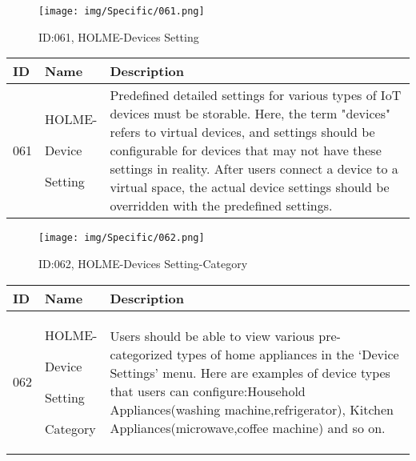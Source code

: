 \documentclass[conference]{IEEEtran}
\begin{document}
\begin{enumerate}
\begin{figure}[h]
\centering
\texttt{[image: img/Specific/061.png]}
\caption{ID:061, HOLME-Devices Setting}
\end{figure}
\begin{table}[h]
\def\arraystretch{1.2} \small
    \begin{tabular}{|p{1cm}|p{1.8cm}|p{5.0cm}|}
        \hline
        ID & Name & Description\\ \hline
         061 \par  & HOLME-\par Device \par Setting  & Predefined detailed settings for various types of IoT devices must be storable. Here, the term "devices" refers to virtual devices, and settings should be configurable for devices that may not have these settings in reality. After users connect a device to a virtual space, the actual device settings should be overridden with the predefined settings.\\ \hline
    \end{tabular}
\end{table}
\clearpage

\begin{figure}[h]
\centering
\texttt{[image: img/Specific/062.png]}
\caption{ID:062, HOLME-Devices Setting-Category}
\end{figure}
\begin{table}[h]
\def\arraystretch{1.2} \small
    \begin{tabular}{|p{1cm}|p{1.8cm}|p{5.0cm}|}
        \hline
        ID & Name & Description\\ \hline
         062 \par  & HOLME-\par Device \par Setting \par Category  & Users should be able to view various pre-categorized types of home appliances in the `Device Settings' menu. Here are examples of device types that users can configure:Household Appliances(washing machine,refrigerator), Kitchen Appliances(microwave,coffee machine) and so on. \\ \hline
    \end{tabular}
\end{table}


\end{enumerate}
\end{document}
